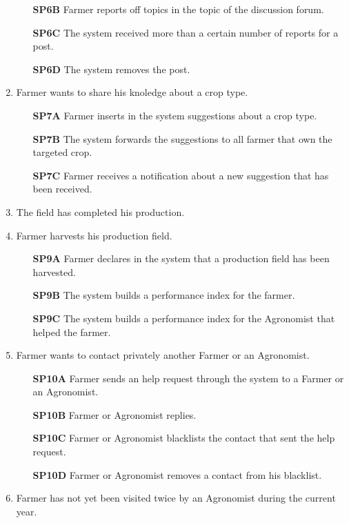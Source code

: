 \begin{enumerate}[label=\textbf{WP\arabic*}]
\begin{enumerate}
					\item [\textbf{SP6B}] Farmer reports off topics in the topic of the discussion forum.
					\item [\textbf{SP6C}] The system received more than a certain number of reports for a post.
					\item [\textbf{SP6D}] The system removes the post.
				\end{enumerate}
			\item \label{wp:WP7} Farmer wants to share his knoledge about a crop type.
				\begin{enumerate}
					\item [\textbf{SP7A}] Farmer inserts in the system suggestions about a crop type.
					\item [\textbf{SP7B}] The system forwards the suggestions to all farmer that own the targeted crop.
					\item [\textbf{SP7C}] Farmer receives a notification about a new suggestion that has been received.
				\end{enumerate}
			\item \label{wp:WP8} The field has completed his production.
			\item \label{wp:WP9} Farmer harvests his production field.
				\begin{enumerate}
					\item [\textbf{SP9A}] Farmer declares in the system that a production field has been harvested.
					\item [\textbf{SP9B}] The system builds a performance index for the farmer.
					\item [\textbf{SP9C}] The system builds a performance index for the Agronomist that helped the farmer.
				\end{enumerate}
			\item \label{wp:WP10} Farmer wants to contact privately another Farmer or an Agronomist.
				\begin{enumerate}
					\item [\textbf{SP10A}] Farmer sends an help request through the system to a Farmer or an Agronomist.
					\item [\textbf{SP10B}] Farmer or Agronomist replies.
					\item [\textbf{SP10C}] Farmer or Agronomist blacklists the contact that sent the help request.
					\item [\textbf{SP10D}] Farmer or Agronomist removes a contact from his blacklist.
				\end{enumerate}
			\item \label{wp:WP11} Farmer has not yet been visited twice by an Agronomist during the current year.

\end{enumerate}
